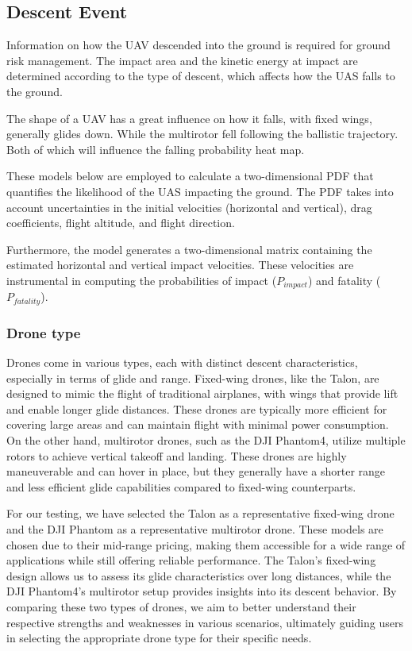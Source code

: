 \documentclass[12pt]{report}
\begin{document}
        \subsection{Descent Event}\label{sec:descent_events} Information on how the UAV descended into the ground is
        required for ground risk management. The impact area and the kinetic energy at impact are determined according
        to the type of descent, which affects how the UAS falls to the ground. 
            
        The shape of a UAV has a great influence on how it falls, with fixed wings, generally glides down. While the
        multirotor fell following the ballistic trajectory. Both of which will influence the falling probability heat
        map. 
            
        These models below are employed to calculate a two-dimensional PDF that quantifies the likelihood of the UAS
        impacting the ground. The PDF takes into account uncertainties in the initial velocities (horizontal and
        vertical), drag coefficients, flight altitude, and flight direction. 
            
        Furthermore, the model generates a two-dimensional matrix containing the estimated horizontal and vertical
        impact velocities. These velocities are instrumental in computing the probabilities of impact (\(P_{impact}\))
        and fatality (\(P_{fatality}\)).

        \subsubsection{Drone type}
        Drones come in various types, each with distinct descent characteristics, especially in terms of glide and
        range. Fixed-wing drones, like the Talon, are designed to mimic the flight of traditional airplanes, with wings
        that provide lift and enable longer glide distances. These drones are typically more efficient for covering
        large areas and can maintain flight with minimal power consumption. On the other hand, multirotor drones, such
        as the DJI Phantom4, utilize multiple rotors to achieve vertical takeoff and landing. These drones are highly
        maneuverable and can hover in place, but they generally have a shorter range and less efficient glide
        capabilities compared to fixed-wing counterparts.
            
        For our testing, we have selected the Talon as a representative fixed-wing drone and the DJI Phantom as a
        representative multirotor drone. These models are chosen due to their mid-range pricing, making them accessible
        for a wide range of applications while still offering reliable performance. The Talon's fixed-wing design allows
        us to assess its glide characteristics over long distances, while the DJI Phantom4's multirotor setup provides
        insights into its descent behavior. By comparing these two types of drones, we aim to better understand their
        respective strengths and weaknesses in various scenarios, ultimately guiding users in selecting the appropriate
        drone type for their specific needs.
\end{document}
